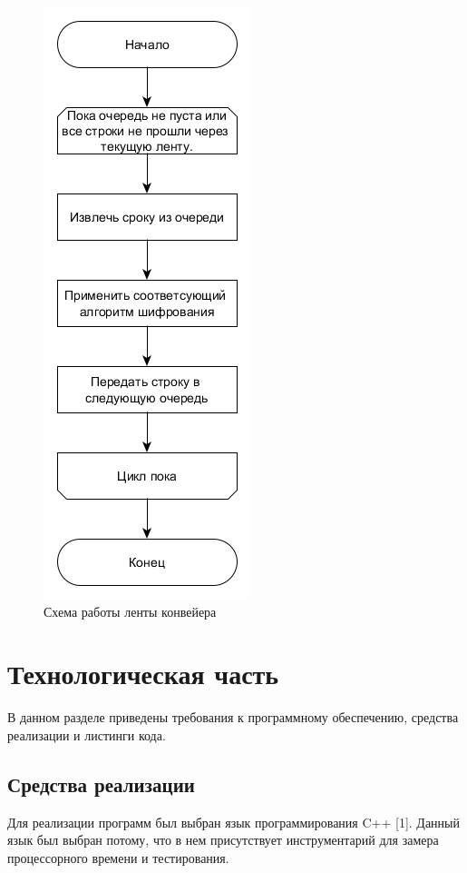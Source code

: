 \begin{figure}
    \centering
    \includegraphics[scale=0.75]{schema_2.png}
    \caption{Схема работы ленты конвейера}
    \label{img:parallel}
\end{figure}



\section{Технологическая часть}

В данном разделе приведены требования к программному обеспечению, средства реализации и листинги кода.



\subsection{Средства реализации}


Для реализации программ был выбран язык программирования C++ [1]. Данный язык был выбран потому, что в нем присутствует инструментарий для замера процессорного времени и тестирования.


